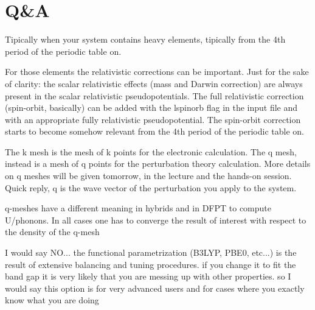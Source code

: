 \section{Q\&A}


  Tipically when your system contains heavy elements, tipically from the 4th period of the periodic table on.

  For those elements the relativistic corrections can be important. Just for the sake of clarity: the scalar relativistic effects (mass and Darwin correction) are always present in the scalar relativistic pseudopotentials. The full relativistic correction (spin-orbit, basically) can be added with the lspinorb flag in the input file and with an appropriate fully relativistic pseudopotential. The spin-orbit correction starts to become somehow relevant from the 4th period of the periodic table on.


  The k mesh is the mesh of k points for the electronic calculation. The q mesh, instead is a mesh of q points for the perturbation theory calculation. More details on q meshes will be given tomorrow, in the lecture and the hands-on session. Quick reply, q is the wave vector of the perturbation you apply to the system.

  q-meshes have a different meaning in hybrids and in DFPT to compute U/phonons. In all cases one has to converge the result of interest with respect to the density of the q-mesh


  I would say NO... the functional parametrization (B3LYP, PBE0, etc...) is the result of extensive balancing and tuning procedures. if you change it to fit the band gap it is very likely that you are messing up with other properties. so I would say this option is for very advanced users and for cases where you exactly know what you are doing



